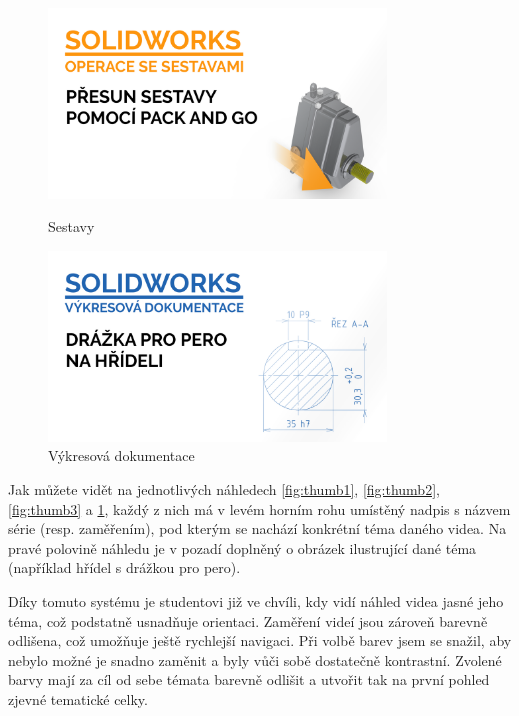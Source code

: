 \begin{figure}[htbp]
    \centering
    \begin{minipage}[b]{0.45\textwidth}
        \centering
        \includegraphics[width=0.8\textwidth]{img/020/pack-and-go-thumbnail.png}
        \caption{Sestavy}
        \label{fig:thumb3}
    \end{minipage}
    \qquad
    \begin{minipage}[b]{0.45\textwidth}
        \centering
        \includegraphics[width=0.8\textwidth]{img/020/dwg-perodr-hr-thumbnail.png}
        \caption{Výkresová dokumentace}
        \label{fig:thumb4}
    \end{minipage}
\end{figure}

Jak můžete vidět na jednotlivých náhledech \ref{fig:thumb1}, \ref{fig:thumb2}, \ref{fig:thumb3} a \ref{fig:thumb4}, každý z nich má v levém horním rohu umístěný nadpis s názvem série (resp. zaměřením), pod kterým se nachází konkrétní téma daného videa.
Na pravé polovině náhledu je v pozadí doplněný o obrázek ilustrující dané téma (například hřídel s drážkou pro pero).

Díky tomuto systému je studentovi již ve chvíli, kdy vidí náhled videa jasné jeho téma, což podstatně usnadňuje orientaci.
Zaměření videí jsou zároveň barevně odlišena, což umožňuje ještě rychlejší navigaci.
Při volbě barev jsem se snažil, aby nebylo možné je snadno zaměnit a byly vůči sobě dostatečně kontrastní.
Zvolené barvy mají za cíl od sebe témata barevně odlišit a utvořit tak na první pohled zjevné tematické celky.

